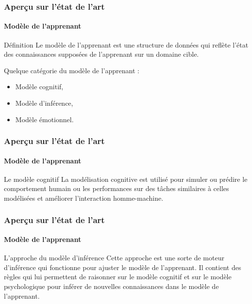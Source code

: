 \documentclass[aspectratio=169,professionalfonts, 12pt]{beamer}
\begin{document}
\begin{frame}
  \frametitle{Aperçu sur l'état de l'art}
  \framesubtitle{Modèle de l’apprenant}
  \justifying 
  \begin{minipage}{\textwidth}
  \begin{block}{Définition}
    Le modèle de l’apprenant est une structure de données qui reflète l’état des connaissances supposées de l’apprenant sur un domaine cible.
  \end{block}
  \end{minipage} 
  \begin{minipage}{\textwidth}
  \begin{block}{}
    Quelque catégorie du modèle de l’apprenant :
    \begin{itemize}
      \item Modèle cognitif,
      \item Modèle d’inférence,
      \item Modèle émotionnel.
    \end{itemize}
  \end{block}
  \end{minipage}
\end{frame}

\begin{frame}
  \frametitle{Aperçu sur l'état de l'art}
  \framesubtitle{Modèle de l’apprenant}
  \justifying 
  \begin{minipage}{\textwidth}
  \begin{block}{Le modèle cognitif}
    La modélisation cognitive est utilisé pour simuler ou prédire le comportement humain ou les performances sur des tâches similaires à celles modélisées et améliorer l'interaction homme-machine.  \end{block}
  \end{minipage} 
\end{frame}

\begin{frame}
  \frametitle{Aperçu sur l'état de l'art}
  \framesubtitle{Modèle de l’apprenant}
  \justifying 
  \begin{minipage}{\textwidth}
  \begin{block}{L’approche du modèle d’inférence}
    Cette approche est une sorte de moteur d’inférence qui fonctionne pour ajuster le modèle de l’apprenant. Il contient des règles qui lui permettent de raisonner sur le modèle cognitif et sur le modèle psychologique pour inférer de nouvelles connaissances dans le modèle de l’apprenant.  
  \end{block}
  \end{minipage} 
\end{frame}
\end{document}
